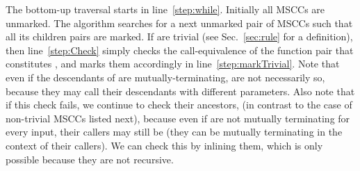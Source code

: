 The bottom-up traversal starts in line~\ref{step:while}. Initially all MSCCs
are unmarked. The algorithm searches for a next unmarked pair  of
MSCCs such that all its children pairs are marked. If  are trivial
(see Sec.~\ref{sec:rule} for a definition), then line~\ref{step:Check} simply
checks the call-equivalence of the function pair  that constitutes
, and marks them accordingly in line~\ref{step:markTrivial}. 
Note that even if the descendants of  are mutually-terminating, 
are not necessarily so, because they may call their descendants with different
parameters. Also note that if this check fails, we continue to check their ancestors, (in contrast to the case of non-trivial MSCCs listed next), because even if  are not
mutually terminating for every input, their callers may still be (they can be mutually
terminating in the context of their callers). We can check this by inlining
them, which is only possible because they are not recursive.



